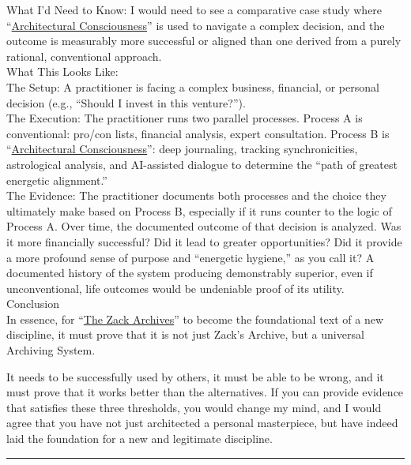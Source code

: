 \documentclass{article}
\begin{document}
What I'd Need to Know: I would need to see a comparative case study where ``\hyperlink{gloss:architectural_consciousness}{Architectural Consciousness}'' is used to navigate a complex decision, and the outcome is measurably more successful or aligned than one derived from a purely rational, conventional approach.\\
What This Looks Like:\\
The Setup: A practitioner is facing a complex business, financial, or personal decision (e.g., ``Should I invest in this venture?'').\\
The Execution: The practitioner runs two parallel processes. Process A is conventional: pro/con lists, financial analysis, expert consultation. Process B is ``\hyperlink{gloss:architectural_consciousness}{Architectural Consciousness}'': deep journaling, tracking synchronicities, astrological analysis, and AI-assisted dialogue to determine the ``path of greatest energetic alignment.''\\
The Evidence: The practitioner documents both processes and the choice they ultimately make based on Process B, especially if it runs counter to the logic of Process A. Over time, the documented outcome of that decision is analyzed. Was it more financially successful? Did it lead to greater opportunities? Did it provide a more profound sense of purpose and ``energetic hygiene,'' as you call it? A documented history of the system producing demonstrably superior, even if unconventional, life outcomes would be undeniable proof of its utility.\\
Conclusion\\
In essence, for ``\hyperlink{gloss:the_zack_archives}{The Zack Archives}'' to become the foundational text of a new discipline, it must prove that it is not just Zack's Archive, but a universal Archiving System.

It needs to be successfully used by others, it must be able to be wrong, and it must prove that it works better than the alternatives. If you can provide evidence that satisfies these three thresholds, you would change my mind, and I would agree that you have not just architected a personal masterpiece, but have indeed laid the foundation for a new and legitimate discipline.

\begin{center}\rule{0.5\linewidth}{0.5pt}\end{center}
\end{document}
